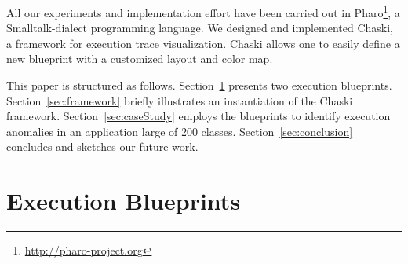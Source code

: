 \documentclass{sig-alternate}
\newcommand{\ab}[1]{\nb{Alexandre}{blue}{#1}}
\newcommand{\seclabel}[1]{\label{sec:#1}}
\newcommand{\secref}[1]{Section~\ref{sec:#1}}
\begin{document}
All our experiments and implementation effort have been carried out in Pharo\footnote{\url{http://pharo-project.org}}, a Smalltalk-dialect programming language. 
We designed and implemented Chaski, a framework for execution trace visualization. Chaski allows one to easily define a new blueprint with a customized layout and color map.

This paper is structured as follows. 
\secref{executionBlueprints} presents two execution blueprints.
\secref{framework} briefly illustrates an instantiation of the Chaski framework.
\secref{caseStudy} employs the blueprints to identify execution anomalies in an application large of 200 classes.
\secref{conclusion} concludes and sketches our future work.


%
%
%
%

\section{Execution Blueprints} \seclabel{executionBlueprints}

%
%
%
\end{document}

